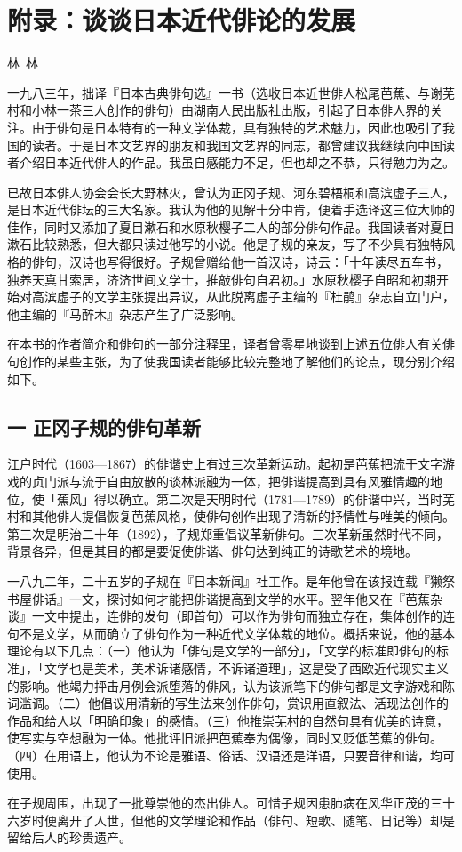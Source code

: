 \chapter{\FS 附录：谈谈日本近代俳论的发展}

{\hfill \FS 林~林}

{\FS
    一九八三年，拙译『日本古典俳句选』一书（选收日本近世俳人松尾芭蕉、与谢芜村和小林一茶三人创作的俳句）由湖南人民出版社出版，引起了日本俳人界的关注。由于俳句是日本特有的一种文学体裁，具有独特的艺术魅力，因此也吸引了我国的读者。于是日本文艺界的朋友和我国文艺界的同志，都曾建议我继续向中国读者介绍日本近代俳人的作品。我虽自感能力不足，但也却之不恭，只得勉力为之。

    已故日本俳人协会会长大野林火，曾认为正冈子规、河东碧梧桐和高滨虚子三人，是日本近代俳坛的三大名家。我认为他的见解十分中肯，便着手选译这三位大师的佳作，同时又添加了夏目漱石和水原秋樱子二人的部分俳句作品。我国读者对夏目漱石比较熟悉，但大都只读过他写的小说。他是子规的亲友，写了不少具有独特风格的俳句，汉诗也写得很好。子规曾赠给他一首汉诗，诗云：「十年读尽五车书，独养天真甘索居，济济世间文学士，推敲俳句自君初。」水原秋樱子自昭和初期开始对高滨虚子的文学主张提出异议，从此脱离虚子主编的『杜鹃』杂志自立门户，他主编的『马醉木』杂志产生了广泛影响。

    在本书的作者简介和俳句的一部分注释里，译者曾零星地谈到上述五位俳人有关俳句创作的某些主张，为了使我国读者能够比较完整地了解他们的论点，现分别介绍如下。
}

\section*{\FS 一 正冈子规的俳句革新}

{\FS
    江户时代（1603—1867）的俳谐史上有过三次革新运动。起初是芭蕉把流于文字游戏的贞门派与流于自由放散的谈林派融为一体，把俳谐提高到具有风雅情趣的地位，使「蕉风」得以确立。第二次是天明时代（1781—1789）的俳谐中兴，当时芜村和其他俳人提倡恢复芭蕉风格，使俳句创作出现了清新的抒情性与唯美的倾向。第三次是明治二十年（1892），子规郑重倡议革新俳句。三次革新虽然时代不同，背景各异，但是其目的都是要促使俳谐、俳句达到纯正的诗歌艺术的境地。

    一八九二年，二十五岁的子规在『日本新闻』社工作。是年他曾在该报连载『獭祭书屋俳话』一文，探讨如何才能把俳谐提高到文学的水平。翌年他又在『芭蕉杂谈』一文中提出，连俳的发句（即首句）可以作为俳句而独立存在，集体创作的连句不是文学，从而确立了俳句作为一种近代文学体裁的地位。概括来说，他的基本理论有以下几点：（一）他认为「俳句是文学的一部分」，「文学的标准即俳句的标准」，「文学也是美术，美术诉诸感情，不诉诸道理」，这是受了西欧近代现实主义的影响。他竭力抨击月例会派堕落的俳风，认为该派笔下的俳句都是文字游戏和陈词滥调。（二）他倡议用清新的写生法来创作俳句，赏识用直叙法、活现法创作的作品和给人以「明确印象」的感情。（三）他推崇芜村的自然句具有优美的诗意，使写实与空想融为一体。他批评旧派把芭蕉奉为偶像，同时又贬低芭蕉的俳句。（四）在用语上，他认为不论是雅语、俗话、汉语还是洋语，只要音律和谐，均可使用。

    在子规周围，出现了一批尊崇他的杰出俳人。可惜子规因患肺病在风华正茂的三十六岁时便离开了人世，但他的文学理论和作品（俳句、短歌、随笔、日记等）却是留给后人的珍贵遗产。
}

